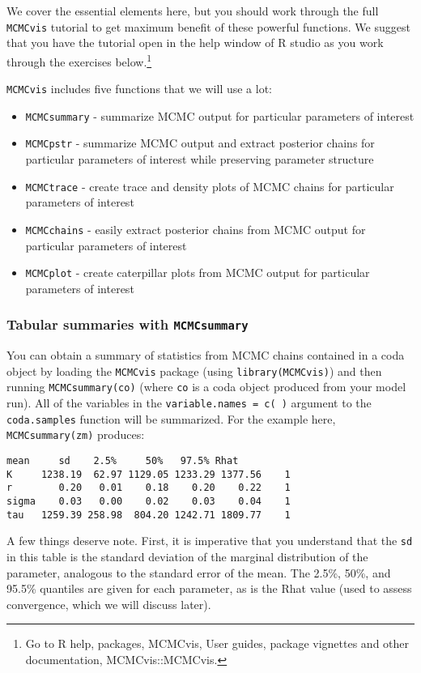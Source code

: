 \documentclass[12pt,english]{article}
\begin{document}
We cover the essential elements here, but you should work through the full \texttt{MCMCvis} tutorial  to get maximum benefit of these powerful functions.  We suggest that you have the tutorial open in the help window of R studio as you work through the exercises below.\footnote{Go to R help, packages, MCMCvis, User guides, package vignettes and other documentation, MCMCvis::MCMCvis.}

 \texttt{MCMCvis} includes five functions that we will use a lot:
\begin{itemize}
\item \texttt{MCMCsummary} - summarize MCMC output for particular parameters of interest
\item \texttt{MCMCpstr} - summarize MCMC output and extract posterior chains for particular parameters of interest while preserving parameter structure
\item \texttt{MCMCtrace} - create trace and density plots of MCMC chains for particular parameters of interest
\item \texttt{MCMCchains} - easily extract posterior chains from MCMC output for particular parameters of interest
\item \texttt{MCMCplot} - create caterpillar plots from MCMC output for particular parameters of interest 
\end{itemize}

\subsubsection{Tabular summaries with \texttt{MCMCsummary}}

You can obtain a summary of statistics from MCMC chains contained in a coda object by loading the \texttt{MCMCvis} package (using \texttt{library(MCMCvis)}) and then running \texttt{MCMCsummary(co)} (where \texttt{co} is a coda object produced from your model run). All of the variables in the \texttt{variable.names = c( )} argument to the \texttt{coda.samples} function will be summarized. For the example here, \texttt{MCMCsummary(zm)} produces:

\begin{Verbatim}[fontsize=\small]
         mean     sd    2.5%     50%   97.5% Rhat
K     1238.19  62.97 1129.05 1233.29 1377.56    1
r        0.20   0.01    0.18    0.20    0.22    1
sigma    0.03   0.00    0.02    0.03    0.04    1
tau   1259.39 258.98  804.20 1242.71 1809.77    1
\end{Verbatim}

\noindent A few things deserve note. First, it is imperative that you understand that the \texttt{sd} in this table is the standard deviation of the marginal distribution of the parameter, analogous to the standard error of the mean. The 2.5\%, 50\%, and 95.5\% quantiles are given for each parameter, as is the Rhat value (used to assess convergence, which we will discuss later).
\end{document}
